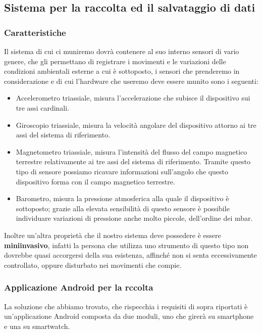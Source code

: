 \documentclass[a4paper]{article}
\begin{document}
	\subsection{Sistema per la raccolta ed il salvataggio di dati}


	\subsubsection{Caratteristiche}
Il sistema di cui ci muniremo dovrà contenere al suo interno sensori di vario genere, che gli permettano di registrare i movimenti e le variazioni delle condizioni ambientali esterne a cui è sottoposto, i sensori che prenderemo in considerazione e di cui l'hardware che useremo deve essere munito sono i seguenti:
\begin{itemize}
\item Accelerometro triassiale, misura l’accelerazione che subisce il dispositivo sui tre assi cardinali.
\item Giroscopio triassiale, misura la velocità angolare del dispositivo attorno ai tre assi del sistema di riferimento.
\item Magnetometro triassiale, misura l’intensità del flusso del campo magnetico terrestre relativamente ai tre assi del sistema di riferimento. Tramite questo tipo di sensore possiamo ricavare informazioni sull’angolo che questo dispositivo forma con il campo magnetico terrestre.
\item Barometro, misura la pressione atmosferica alla quale il dispositivo è sottoposto; grazie alla elevata sensibilità di questo sensore è possibile individuare variazioni di pressione anche molto piccole, dell’ordine dei mbar.
\end{itemize}
Inoltre un'altra proprietà che il nostro sistema deve possedere è essere \textbf{miniinvasivo}, infatti la persona che utilizza uno strumento di questo tipo non dovrebbe quasi accorgersi della sua esistenza, affinché non si senta eccessivamente controllato, oppure disturbato nei movimenti che compie.


	\subsubsection{Applicazione Android per la rccolta}
La soluzione che abbiamo trovato, che rispecchia i requisiti di sopra riportati è un'applicazione Android composta da due moduli, uno che girerà su smartphone e una su smartwatch.

\makebox[\linewidth]{}
\end{document}
